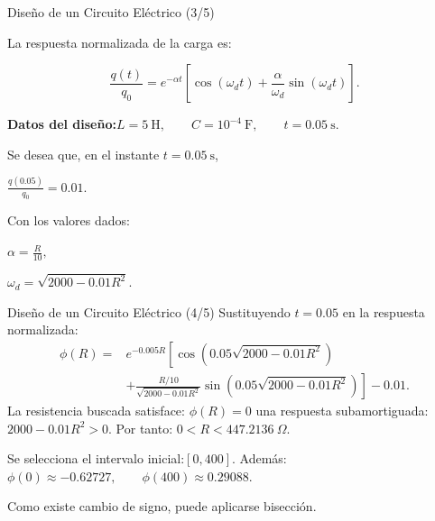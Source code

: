 \documentclass[../../main.tex]{subfiles}
\begin{document}
\begin{frame}{Dise\~no de un Circuito El\'ectrico (3/5)}

La respuesta normalizada de la carga es:

\[
\frac{q(t)}{q_0}
=
e^{-\alpha t}
\left[
\cos(\omega_d t)
+
\frac{\alpha}{\omega_d}
\sin(\omega_d t)
\right].
\]

\textbf{Datos del dise\~no:}\(
L=5\ \text{H},
\qquad
C=10^{-4}\ \text{F},
\qquad
t=0.05\ \text{s}.
\)

Se desea que, en el instante \(t=0.05\ \text{s}\),

\(
\frac{q(0.05)}{q_0}=0.01.
\)

Con los valores dados:

\(
\alpha=\frac{R}{10},
\)

\(
\omega_d
=
\sqrt{
2000-0.01R^2
}.
\)

\end{frame}



\begin{frame}{Dise\~no de un Circuito El\'ectrico (4/5)}
Sustituyendo \(t=0.05\) en la respuesta normalizada:
\[
\begin{aligned}
\phi(R)
={}&e^{-0.005R}
\left[
\cos\left(
0.05\sqrt{2000-0.01R^2}
\right)\right.\\
&\left.
+\frac{R/10}{\sqrt{2000-0.01R^2}}
\sin\left(
0.05\sqrt{2000-0.01R^2}
\right)
\right]
-0.01.
\end{aligned}
\]
La resistencia buscada satisface:
\(
\boxed{\phi(R)=0}
\)
 una respuesta subamortiguada: \(2000-0.01R^2>0.\)
Por tanto:
\(
0<R<447.2136\ \Omega.
\)

Se selecciona el intervalo inicial:\([0,400].\)
Además:\(
\phi(0)\approx-0.62727,
\qquad
\phi(400)\approx0.29088.
\)

Como existe cambio de signo, puede aplicarse bisecci\'on.

\end{frame}

\end{document}
